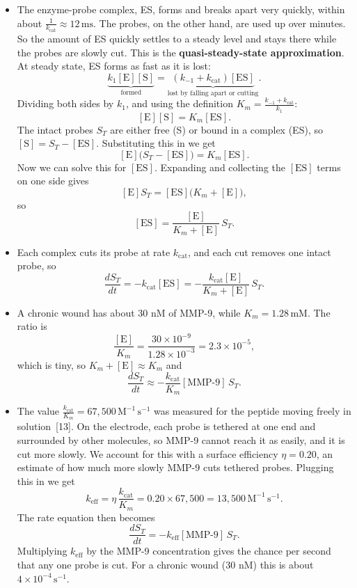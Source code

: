 \documentclass[10pt,a4paper]{article}
\numberwithin{equation}{section}
\newcommand{\cit}[1]{[#1]}
\newcommand{\keff}{k_{\mathrm{eff}}}
\newcommand{\kcat}{k_{\mathrm{cat}}}
\newcommand{\MMP}{[\text{MMP-9}]}
\newcommand{\dropdown}{\par\medskip}
\begin{document}
\dropdown
\begin{itemize}
  \item The enzyme-probe complex, ES, forms and breaks apart very quickly, within about $\frac{1}{\kcat}\approx12\,\mathrm{ms}$. The probes, on the other hand, are used up over minutes. So the amount of ES quickly settles to a steady level and stays there while the probes are slowly cut. This is the \textbf{quasi-steady-state approximation}. At steady state, ES forms as fast as it is lost:
  \[ \underbrace{k_1[\text{E}][\text{S}]}_{\text{formed}} = \underbrace{(k_{-1} + \kcat)[\text{ES}]}_{\text{lost by falling apart or cutting}}. \]
  Dividing both sides by $k_1$, and using the definition $K_m = \frac{k_{-1} + \kcat}{k_1}$:
  \[ [\text{E}][\text{S}] = K_m[\text{ES}]. \]
  The intact probes $S_T$ are either free (S) or bound in a complex (ES), so $[\text{S}] = S_T - [\text{ES}]$. Substituting this in we get
  \[ [\text{E}]\big(S_T - [\text{ES}]\big) = K_m[\text{ES}]. \]
  Now we can solve this for $[\text{ES}]$. Expanding and collecting the $[\text{ES}]$ terms on one side gives
  \[ [\text{E}]S_T = [\text{ES}]\big(K_m + [\text{E}]\big), \]
  so
  \[ [\text{ES}] = \frac{[\text{E}]}{K_m + [\text{E}]}\,S_T. \]
  \item Each complex cuts its probe at rate $\kcat$, and each cut removes one intact probe, so
  \[ \frac{dS_T}{dt} = -\kcat[\text{ES}] = -\frac{\kcat[\text{E}]}{K_m + [\text{E}]}\,S_T. \]
  \item A chronic wound has about 30 nM of MMP-9, while $K_m = 1.28\,\mathrm{mM}$. The ratio is
  \[ \frac{[\text{E}]}{K_m} = \frac{30\times10^{-9}}{1.28\times10^{-3}} = 2.3\times10^{-5}, \]
  which is tiny, so $K_m + [\text{E}]\approx K_m$ and
  \[ \frac{dS_T}{dt}\approx-\frac{\kcat}{K_m}\MMP\,S_T. \]
  \item The value $\frac{\kcat}{K_m} = 67{,}500\,\mathrm{M^{-1}\,s^{-1}}$ was measured for the peptide moving freely in solution~\cit{13}. On the electrode, each probe is tethered at one end and surrounded by other molecules, so MMP-9 cannot reach it as easily, and it is cut more slowly. We account for this with a surface efficiency $\eta = 0.20$, an estimate of how much more slowly MMP-9 cuts tethered probes. Plugging this in we get
  \[ \keff = \eta\,\frac{\kcat}{K_m} = 0.20\times67{,}500 = 13{,}500\,\mathrm{M^{-1}\,s^{-1}}. \]
  The rate equation then becomes
  \[ \frac{dS_T}{dt} = -\keff\MMP\,S_T. \]
  Multiplying $\keff$ by the MMP-9 concentration gives the chance per second that any one probe is cut. For a chronic wound (30 nM) this is about $4\times10^{-4}\,\mathrm{s^{-1}}$.
\end{itemize}
\end{document}
